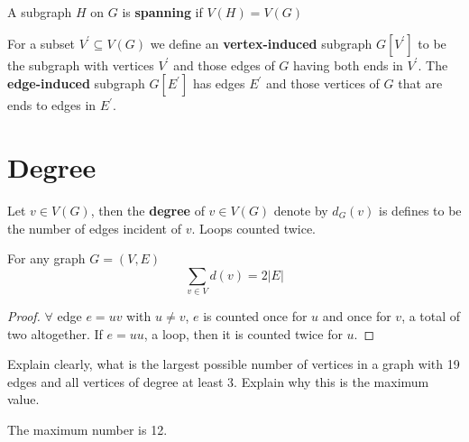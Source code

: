 			\begin{definition}[Spanning]
				A subgraph $H$ on $G$ is \textbf{spanning} if $V(H) = V(G)$
			\end{definition}

			\begin{definition}
				For a subset $V^{'}\subseteq V(G)$ we define an \textbf{vertex-induced} subgraph $G[V^{'}]$ to be the subgraph with vertices $V^{'}$ and those edges of $G$ having both ends in $V^{'}$. The \textbf{edge-induced} subgraph $G[E^{'}]$ has edges $E^{'}$ and those vertices of $G$ that are ends to edges in $E^{'}$.
			\end{definition}


		\section{Degree}
			\begin{definition}[Degree]
				Let $v\in V(G)$, then the \textbf{degree} of $v\in V(G)$ denote by $d_G(v)$ is defines to be the number of edges incident of $v$. Loops counted twice.
			\end{definition}

			\begin{theorem}
				For any graph $G=(V, E)$
				\begin{equation}
					\sum_{v\in V}d(v) = 2|E|
				\end{equation}
			\end{theorem}

			\begin{proof}
				$\forall$ edge $e=uv$ with $u \neq v$, $e$ is counted once for $u$ and once for $v$, a total of two altogether. If $e=uu$, a loop, then it is counted twice for $u$.
			\end{proof}

			\begin{problem}
				Explain clearly, what is the largest possible number of vertices in a graph with 19 edges and all vertices of degree at least 3. Explain why this is the maximum value.
			\end{problem}

			\begin{solution}
				The maximum number is 12.
			\end{solution}

